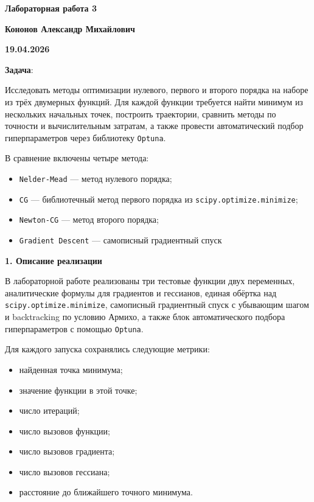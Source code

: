 \documentclass[12pt]{article}
\begin{document}
\begin{large}
\begin{center}
\LARGE \textbf{Лабораторная работа 3}\par
\LARGE \textbf{Кононов Александр Михайлович}\par
\textbf{19.04.2026}
\end{center}

\par \textbf{Задача}:
\par Исследовать методы оптимизации нулевого, первого и второго порядка на наборе из трёх двумерных функций. Для каждой функции требуется найти минимум из нескольких начальных точек, построить траектории, сравнить методы по точности и вычислительным затратам, а также провести автоматический подбор гиперпараметров через библиотеку \texttt{Optuna}.

\par В сравнение включены четыре метода:
\begin{itemize}
    \item \texttt{Nelder-Mead} --- метод нулевого порядка;
    \item \texttt{CG} --- библиотечный метод первого порядка из \texttt{scipy.optimize.minimize};
    \item \texttt{Newton-CG} --- метод второго порядка;
    \item \texttt{Gradient Descent} --- самописный градиентный спуск
\end{itemize}

\par \textbf{1. Описание реализации}

\par В лабораторной работе реализованы три тестовые функции двух переменных, аналитические формулы для градиентов и гессианов, единая обёртка над \texttt{scipy.optimize.minimize}, самописный градиентный спуск с убывающим шагом и backtracking по условию Армихо, а также блок автоматического подбора гиперпараметров с помощью \texttt{Optuna}.

\par Для каждого запуска сохранялись следующие метрики:
\begin{itemize}
    \item найденная точка минимума;
    \item значение функции в этой точке;
    \item число итераций;
    \item число вызовов функции;
    \item число вызовов градиента;
    \item число вызовов гессиана;
    \item расстояние до ближайшего точного минимума.
\end{itemize}


\end{large}
\end{document}

